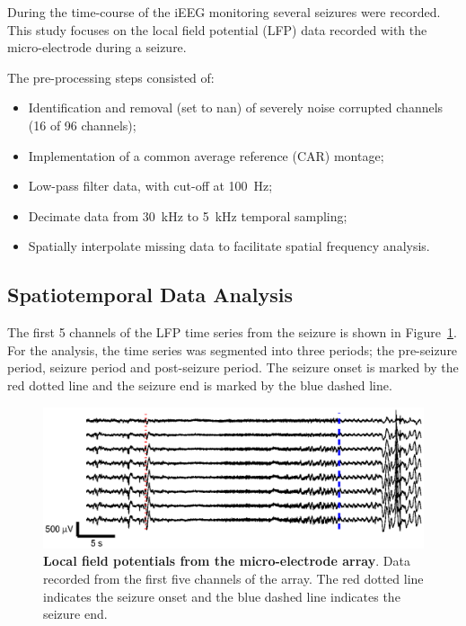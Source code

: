 \documentclass[]{article}
\begin{document}
During the time-course of the iEEG monitoring several seizures were recorded. This study focuses on the local field potential (LFP) data recorded with the micro-electrode during a seizure. 

The pre-processing steps consisted of:
\begin{itemize}
	\item Identification and removal (set to nan) of severely noise corrupted channels (16 of 96 channels);
	\item Implementation of a common average reference (CAR) montage; 
	\item Low-pass filter data, with cut-off at 100~Hz;
	\item Decimate data from 30~kHz to 5~kHz temporal sampling;
	\item Spatially interpolate missing data to facilitate spatial frequency analysis.
\end{itemize}

\subsection{Spatiotemporal Data Analysis}
The first 5 channels of the LFP time series from the seizure is shown in Figure~\ref{fig:TimeSeries}. For the analysis, the time series was segmented into three periods; the pre-seizure period, seizure period and post-seizure period. The seizure onset is marked by the red dotted line and the seizure end is marked by the blue dashed line. 

\begin{figure}[!ht]
\begin{center}
\includegraphics{./Figures/LFPs.eps}
\end{center}
\caption{{\bf Local field potentials from the micro-electrode array}. Data recorded from the first five channels of the array. The red dotted line indicates the seizure onset and the blue dashed line indicates the seizure end.}
\label{fig:TimeSeries}
\end{figure}
\end{document}
